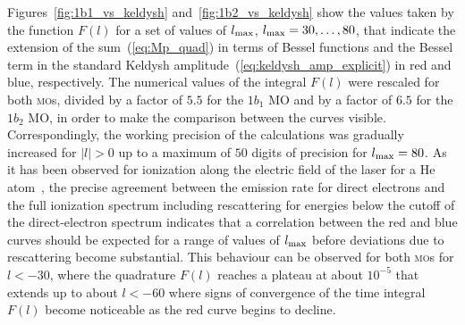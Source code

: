 Figures~\ref{fig:1b1_vs_keldysh} and~\ref{fig:1b2_vs_keldysh} show the
values taken by the function $F(l)$ for a set of values of
$l_{\rm{max}}$, $l_{\rm{max}} = 30,\dots,80$, that indicate the
extension of the sum~(\ref{eq:Mp_quad}) in terms of Bessel functions
and the Bessel term in the standard Keldysh
amplitude~(\ref{eq:keldysh_amp_explicit}) in red and blue,
respectively. The numerical values of the integral $F(l)$ were
rescaled for both \textsc{mo}s, divided by a factor of $5.5$ for
the $1b_{1}$ MO and by a factor of $6.5$ for the $1b_{2}$ MO, in order
to make the comparison between the curves visible. Correspondingly,
the working precision of the calculations was gradually increased for
$|l| > 0$ up to a maximum of $50$ digits of precision for
$l_{\rm{max}} = 80$. As it has been observed for ionization along the
electric field of the laser for a He atom~\cite{Kopold_1997sfa}, the
precise agreement between the emission rate for direct electrons and
the full ionization spectrum including rescattering for energies below
the cutoff of the direct-electron spectrum indicates that a
correlation between the red and blue curves should be expected for a
range of values of $l_{\rm{max}}$ before deviations due to
rescattering become substantial. This behaviour can be observed for
both \textsc{mo}s for $l < -30$, where the quadrature $F(l)$
reaches a plateau at about $10^{-5}$ that extends up to about $l <
-60$ where signs of convergence of the time integral $F(l)$ become
noticeable as the red curve begins to decline.

